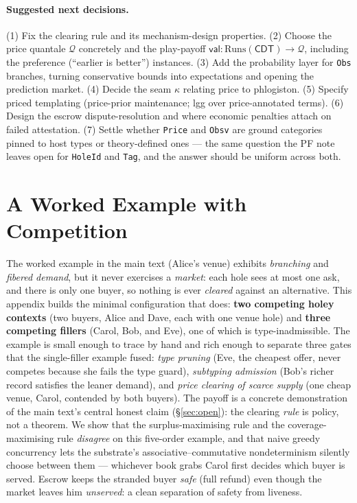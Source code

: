 \documentclass[11pt]{article}
\theoremstyle{definition}
\newcommand{\PF}{\textsf{PF}}
\newcommand{\CDT}{\textsf{CDT}}
\newcommand{\val}{\ensuremath{\mathsf{val}}}
\newcommand{\Qval}{\mathcal{Q}}            %
\newcommand{\Runs}{\mathrm{Runs}}
\begin{document}
\paragraph{Suggested next decisions.} (1) Fix the clearing rule and its mechanism-design properties.
(2) Choose the price quantale $\Qval$ concretely and the play-payoff $\val:\Runs(\CDT)\to\Qval$,
including the preference (``earlier is better'') instances. (3) Add the probability layer for
\texttt{Obs} branches, turning conservative bounds into expectations and opening the prediction
market. (4) Decide the seam $\kappa$ relating price to phlogiston. (5) Specify priced templating
(price-prior maintenance; lgg over price-annotated terms). (6) Design the escrow dispute-resolution
and where economic penalties attach on failed attestation. (7) Settle whether \texttt{Price} and
\texttt{Obsv} are ground categories pinned to host types or theory-defined ones --- the same
question the \PF{} note leaves open for \texttt{HoleId} and \texttt{Tag}, and the answer should be
uniform across both.


\appendix
\section{A Worked Example with Competition}\label{app:worked}
The worked example in the main text (Alice's venue) exhibits \emph{branching} and \emph{fibered
demand}, but it never exercises a \emph{market}: each hole sees at most one ask, and there is only one
buyer, so nothing is ever \emph{cleared} against an alternative. This appendix builds the minimal
configuration that does: \textbf{two competing holey contexts} (two buyers, Alice and Dave, each with
one venue hole) and \textbf{three competing fillers} (Carol, Bob, and Eve), one of which is
type-inadmissible. The example is small enough to trace by hand and rich enough to separate three
gates that the single-filler example fused: \emph{type pruning} (Eve, the cheapest offer, never
competes because she fails the type guard), \emph{subtyping admission} (Bob's richer record satisfies
the leaner demand), and \emph{price clearing of scarce supply} (one cheap venue, Carol, contended by
both buyers). The payoff is a concrete demonstration of the main text's central honest claim
(\S\ref{sec:open}): the clearing \emph{rule} is policy, not a theorem. We show that the surplus-maximising rule
and the coverage-maximising rule \emph{disagree} on this five-order example, and that naive
greedy concurrency lets the substrate's associative--commutative nondeterminism silently choose
between them --- whichever book grabs Carol first decides which buyer is served. Escrow keeps the
stranded buyer \emph{safe} (full refund) even though the market leaves him \emph{unserved}: a clean
separation of safety from liveness.
\end{document}
